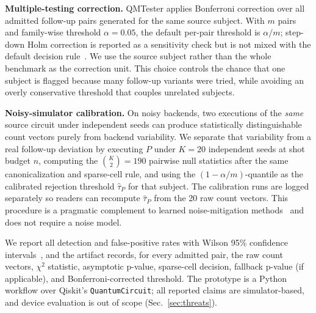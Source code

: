 \noindent\textbf{Multiple-testing correction.}
QMTester applies Bonferroni correction over all admitted follow-up pairs generated for the same source subject. With $m$ pairs and family-wise threshold $\alpha=0.05$, the default per-pair threshold is $\alpha/m$; step-down Holm correction is reported as a sensitivity check but is not mixed with the default decision rule~\cite{holm1979simple}. We use the source subject rather than the whole benchmark as the correction unit. This choice controls the chance that one subject is flagged because many follow-up variants were tried, while avoiding an overly conservative threshold that couples unrelated subjects.

\noindent\textbf{Noisy-simulator calibration.}
On noisy backends, two executions of the \emph{same} source circuit under independent seeds can produce statistically distinguishable count vectors purely from backend variability. We separate that variability from a real follow-up deviation by executing $P$ under $K=20$ independent seeds at shot budget $n$, computing the $\binom{K}{2}=190$ pairwise null statistics after the same canonicalization and sparse-cell rule, and using the $(1-\alpha/m)$-quantile as the calibrated rejection threshold $\hat\tau_P$ for that subject. The calibration runs are logged separately so readers can recompute $\hat\tau_P$ from the 20 raw count vectors. This procedure is a pragmatic complement to learned noise-mitigation methods~\cite{muqeet2024noise} and does not require a noise model.

We report all detection and false-positive rates with Wilson 95\% confidence intervals~\cite{wilson1927probable}, and the artifact records, for every admitted pair, the raw count vectors, $\chi^2$ statistic, asymptotic p-value, sparse-cell decision, fallback p-value (if applicable), and Bonferroni-corrected threshold. The prototype is a Python workflow over Qiskit's \texttt{QuantumCircuit}; all reported claims are simulator-based, and device evaluation is out of scope (Sec.~\ref{sec:threats}).
